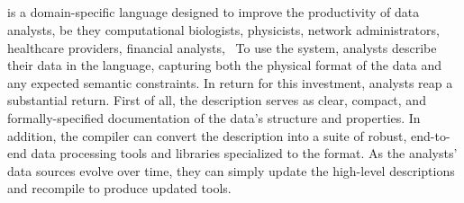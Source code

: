 


\subsection{\padsmlbig{}}


\padsml{} is a domain-specific language designed to 
improve the productivity of data analysts, be they computational biologists, physicists, network administrators, healthcare providers, financial analysts, \etc\
To use the system, analysts describe their data in the \padsml{} language, capturing both the physical format of the data and any expected semantic constraints.  In return for this investment, analysts reap a substantial return.
First of all, the description
serves as clear, compact, and formally-specified documentation of 
the data's structure and properties.  In addition, the \padsml{}
compiler can convert the description into a suite of robust, end-to-end
data processing tools and libraries specialized
to the format.  As the analysts' data sources evolve over time,
they can simply update the high-level descriptions
and recompile to produce updated tools.


